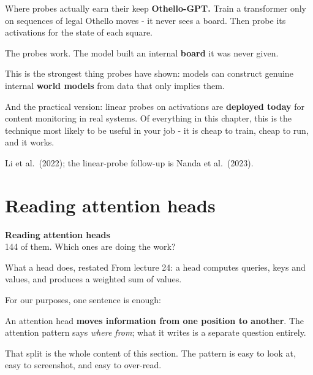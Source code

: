 \documentclass[aspectratio=169]{beamer}
\newcommand{\keybox}[1]{%
  \begin{tcolorbox}[colback=armblue!8, colframe=armblue, boxrule=0.6pt, arc=2pt]
  #1
  \end{tcolorbox}}
\newcommand{\sectiontransition}[2]{%
  \begin{frame}[plain]
    \vfill
    \begin{center}
      {\Huge\bfseries\color{popblue} #1}\\[1.1em]
      {\large #2}
    \end{center}
    \vfill
  \end{frame}}
\begin{document}
\begin{frame}{Where probes actually earn their keep}
  \vspace{0.6em}
  \textbf{Othello-GPT.} Train a transformer only on sequences of legal Othello moves - it never
  sees a board. Then probe its activations for the state of each square.

  \vspace{0.5em}
  The probes work. The model built an internal \textbf{board} it was never given.

  \vspace{0.9em}
  \keybox{This is the strongest thing probes have shown: models can construct genuine internal
  \textbf{world models} from data that only implies them.}

  \vspace{0.8em}
  And the practical version: linear probes on activations are \textbf{deployed today} for
  content monitoring in real systems. Of everything in this chapter, this is the
  technique most likely to be useful in your job - it is cheap to train, cheap to run, and it
  works.

  \vspace{0.5em}
  {\footnotesize Li et al.\ (2022); the linear-probe follow-up is Nanda et al.\ (2023).}
\end{frame}

\section{Reading attention heads}
\sectiontransition{Reading attention heads}{144 of them. Which ones are doing the work?}

\begin{frame}{What a head does, restated}
  \vspace{0.7em}
  From lecture 24: a head computes queries, keys and values, and produces a weighted sum of
  values.

  \vspace{0.6em}
  For our purposes, one sentence is enough:

  \vspace{0.6em}
  \keybox{An attention head \textbf{moves information from one position to another}. The
  attention pattern says \emph{where from}; what it writes is a separate question entirely.}

  \vspace{0.9em}
  That split is the whole content of this section. The pattern is easy to look at, easy to
  screenshot, and easy to over-read.
\end{frame}
\end{document}
